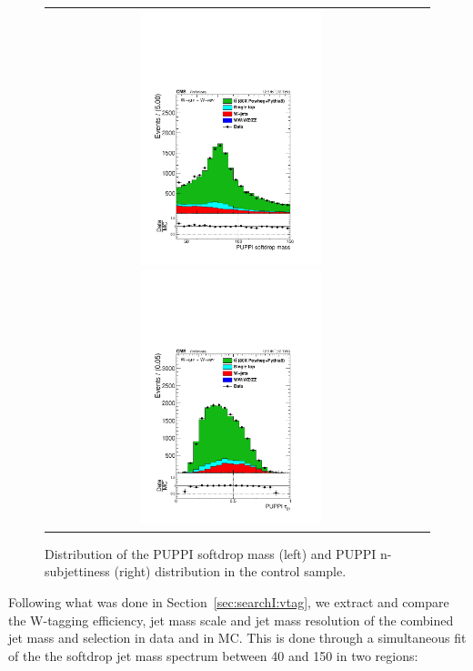 \begin{figure}[h!]
\centering
\begin{tabular}{cc}
\includegraphics[width=0.5\textwidth]{figures/vtagging/AN-16-342/controlplots/Whadr_puppi_softdrop_powheg.pdf}
\includegraphics[width=0.5\textwidth]{figures/vtagging/AN-16-342/controlplots/Whadr_puppi_tau2tau1_powheg.pdf}\\
\end{tabular}
\caption{Distribution of the PUPPI softdrop mass (left) and PUPPI n-subjettiness (right) distribution in the \ttbar control sample.}
\label{fig:searchII:ttbarcp}
\end{figure}
Following what was done in Section~\ref{sec:searchI:vtag}, we extract and compare the W-tagging efficiency, jet mass scale and jet mass resolution of the combined jet mass and \nsubj selection in data and in MC. This is done through a simultaneous fit of the the softdrop jet mass spectrum between 40 and 150 \GeV in two regions:

